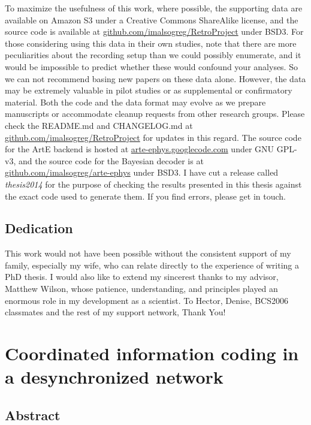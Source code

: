 \documentclass[]{article}
\let\stdsection\section
\renewcommand\section{\newpage\stdsection}
\begin{document}
To maximize the usefulness of this work, where possible, the supporting
data are available on Amazon S3 under a Creative Commons ShareAlike
license, and the source code is available at
\href{http://github.com/imalsogreg/RetroProject}{github.com/imalsogreg/RetroProject}
under BSD3. For those considering using this data in their own studies,
note that there are more peculiarities about the recording setup than we
could possibly enumerate, and it would be impossible to predict whether
these would confound your analyses. So we can not recommend basing new
papers on these data alone. However, the data may be extremely valuable
in pilot studies or as supplemental or confirmatory material. Both the
code and the data format may evolve as we prepare manuscripts or
accommodate cleanup requests from other research groups. Please check
the README.md and CHANGELOG.md at
\href{http://github.com/imalsogreg/RetroProject}{github.com/imalsogreg/RetroProject}
for updates in this regard. The source code for the ArtE backend is
hosted at
\href{http://arte-ephys.googlecode.com}{arte-ephys.googlecode.com} under
GNU GPL-v3, and the source code for the Bayesian decoder is at
\href{http://github.com/imalsogreg/arte-ephys}{github.com/imalsogreg/arte-ephys}
under BSD3. I have cut a release called \emph{thesis2014} for the
purpose of checking the results presented in this thesis against the
exact code used to generate them. If you find errors, please get in
touch.

\subsection{Dedication}

This work would not have been possible without the consistent support of
my family, especially my wife, who can relate directly to the experience
of writing a PhD thesis. I would also like to extend my sincerest thanks
to my advisor, Matthew Wilson, whose patience, understanding, and
principles played an enormous role in my development as a scientist. To
Hector, Denise, BCS2006 classmates and the rest of my support network,
Thank You!

\section{Coordinated information coding in a desynchronized network}

\subsection{Abstract}
\end{document}
